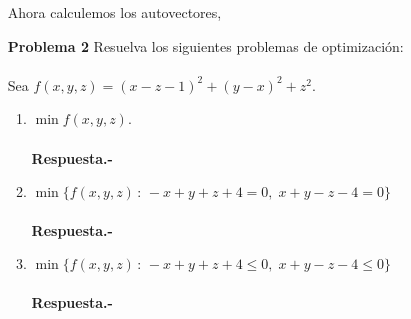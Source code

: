 \begin{enumerate}
    Ahora calculemos los autovectores,




    \item [\bfseries Problema 2] Resuelva los siguientes problemas de optimización:\\\\
	Sea $f(x,y,z)=(x-z-1)^2+(y-x)^2 + z^2.$

	\begin{enumerate}[\bfseries a)]
	    \item $\min f(x,y,z)$.\\\\
		\textbf{Respuesta.-}\; 

	    \item $\min\lbrace f(x,y,z) \, : \, -x+y+z+4=0,\; x+y-z-4=0\rbrace$\\\\
		\textbf{Respuesta.-}\;

	    \item $\min \lbrace f(x,y,z) \, : \, -x+y+z+4\leq 0,\; x+y-z-4\leq 0 \rbrace$\\\\
		\textbf{Respuesta.-}\;

	\end{enumerate}

\end{enumerate}




